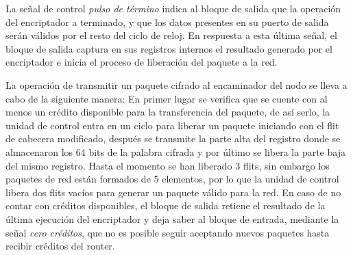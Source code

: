 La señal de control \textit{pulso de término} indica al bloque de salida que la operación del encriptador a terminado, y que los datos presentes en su puerto de salida serán válidos por el resto del ciclo de reloj. En respuesta a esta última señal, el bloque de salida captura en sus registros internos el resultado generado por el encriptador e inicia el proceso de liberación del paquete a la red.


La operación de transmitir un paquete cifrado al encaminador del nodo se lleva a cabo de la siguiente manera: En primer lugar se verifica que se cuente con al menos un crédito disponible para la transferencia del paquete, de así serlo, la unidad de control entra en un ciclo para liberar un paquete iniciando con el flit de cabecera modificado, después se transmite la parte alta del registro donde se almacenaron los 64 bits de la palabra cifrada y por último se libera la parte baja del mismo registro. Hasta el momento se han liberado 3 flits, sin embargo los paquetes de red están formados de 5 elementos, por lo que la unidad de control libera dos flits vacíos para generar un paquete válido para la red. En caso de no contar con créditos disponibles, el bloque de salida retiene el resultado de la última ejecución del encriptador y deja saber al bloque de entrada, mediante la señal \textit{cero créditos}, que no es posible seguir aceptando nuevos paquetes hasta recibir créditos del router.